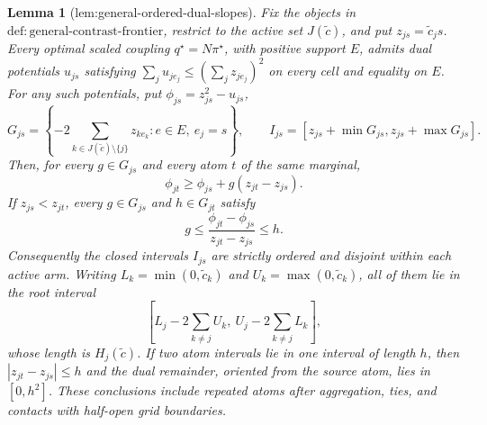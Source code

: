 \documentclass{article}
\newtheorem{lemma}{Lemma}
\begin{document}
\begin{lemma}[lem:general-ordered-dual-slopes]\label{lem:general-ordered-dual-slopes}
Fix the objects in \(\mathrm{def{:}general\mbox{-}contrast\mbox{-}frontier}\), restrict to the active set \(J(\widetilde c)\), and put \(z_{js}=\widetilde c_js\).  Every optimal scaled coupling \(q^\star=N\pi^\star\), with positive support \(E\), admits dual potentials \(u_{js}\) satisfying \(\sum_ju_{je_j}\le(\sum_jz_{je_j})^2\) on every cell and equality on \(E\).  For any such potentials, put \(\phi_{js}=z_{js}^2-u_{js}\),
\[
 G_{js}=\left\{-2\sum_{k\in J(\widetilde c)\setminus\{j\}}z_{ke_k}:e\in E,\ e_j=s\right\},
 \qquad I_{js}=[z_{js}+\min G_{js},z_{js}+\max G_{js}].
\]
Then, for every \(g\in G_{js}\) and every atom \(t\) of the same marginal,
\[
 \phi_{jt}\ge\phi_{js}+g(z_{jt}-z_{js}).
\]
If \(z_{js}<z_{jt}\), every \(g\in G_{js}\) and \(h\in G_{jt}\) satisfy
\[
 g\le\frac{\phi_{jt}-\phi_{js}}{z_{jt}-z_{js}}\le h.
\]
Consequently the closed intervals \(I_{js}\) are strictly ordered and disjoint within each active arm.  Writing \(L_k=\min(0,\widetilde c_k)\) and \(U_k=\max(0,\widetilde c_k)\), all of them lie in the root interval
\[
 \left[L_j-2\sum_{k\ne j}U_k,\ U_j-2\sum_{k\ne j}L_k\right],
\]
whose length is \(H_j(\widetilde c)\).  If two atom intervals lie in one interval of length \(h\), then \(|z_{jt}-z_{js}|\le h\) and the dual remainder, oriented from the source atom, lies in \([0,h^2]\).  These conclusions include repeated atoms after aggregation, ties, and contacts with half-open grid boundaries.
\end{lemma}
\end{document}
